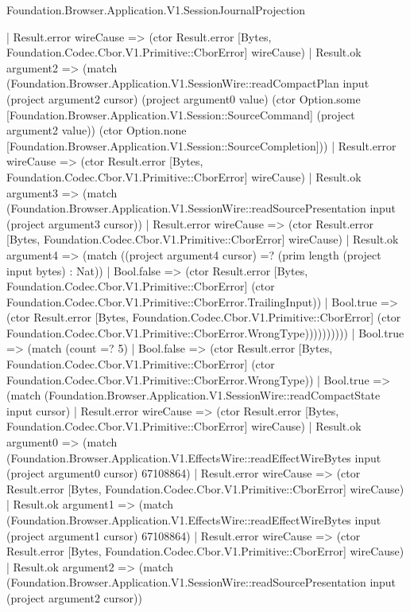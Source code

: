 \begin{lexlean}{Foundation.Browser.Application.V1.SessionJournalProjection}
\begin{semanticmodule}
{                            | Result.error wireCause => (ctor Result.error [Bytes, Foundation.Codec.Cbor.V1.Primitive::CborError] wireCause)
                            | Result.ok argument2 => (match (Foundation.Browser.Application.V1.SessionWire::readCompactPlan input (project argument2 cursor) (project argument0 value) (ctor Option.some [Foundation.Browser.Application.V1.Session::SourceCommand] (project argument2 value)) (ctor Option.none [Foundation.Browser.Application.V1.Session::SourceCompletion]))
                              | Result.error wireCause => (ctor Result.error [Bytes, Foundation.Codec.Cbor.V1.Primitive::CborError] wireCause)
                              | Result.ok argument3 => (match (Foundation.Browser.Application.V1.SessionWire::readSourcePresentation input (project argument3 cursor))
                                | Result.error wireCause => (ctor Result.error [Bytes, Foundation.Codec.Cbor.V1.Primitive::CborError] wireCause)
                                | Result.ok argument4 => (match ((project argument4 cursor) =? (prim length (project input bytes) : Nat))
                                  | Bool.false => (ctor Result.error [Bytes, Foundation.Codec.Cbor.V1.Primitive::CborError] (ctor Foundation.Codec.Cbor.V1.Primitive::CborError.TrailingInput))
                                  | Bool.true => (ctor Result.error [Bytes, Foundation.Codec.Cbor.V1.Primitive::CborError] (ctor Foundation.Codec.Cbor.V1.Primitive::CborError.WrongType))))))))))
                  | Bool.true => (match (count =? 5)
                    | Bool.false => (ctor Result.error [Bytes, Foundation.Codec.Cbor.V1.Primitive::CborError] (ctor Foundation.Codec.Cbor.V1.Primitive::CborError.WrongType))
                    | Bool.true => (match (Foundation.Browser.Application.V1.SessionWire::readCompactState input cursor)
                      | Result.error wireCause => (ctor Result.error [Bytes, Foundation.Codec.Cbor.V1.Primitive::CborError] wireCause)
                      | Result.ok argument0 => (match (Foundation.Browser.Application.V1.EffectsWire::readEffectWireBytes input (project argument0 cursor) 67108864)
                        | Result.error wireCause => (ctor Result.error [Bytes, Foundation.Codec.Cbor.V1.Primitive::CborError] wireCause)
                        | Result.ok argument1 => (match (Foundation.Browser.Application.V1.EffectsWire::readEffectWireBytes input (project argument1 cursor) 67108864)
                          | Result.error wireCause => (ctor Result.error [Bytes, Foundation.Codec.Cbor.V1.Primitive::CborError] wireCause)
                          | Result.ok argument2 => (match (Foundation.Browser.Application.V1.SessionWire::readSourcePresentation input (project argument2 cursor))
}
\end{semanticmodule}
\end{lexlean}
